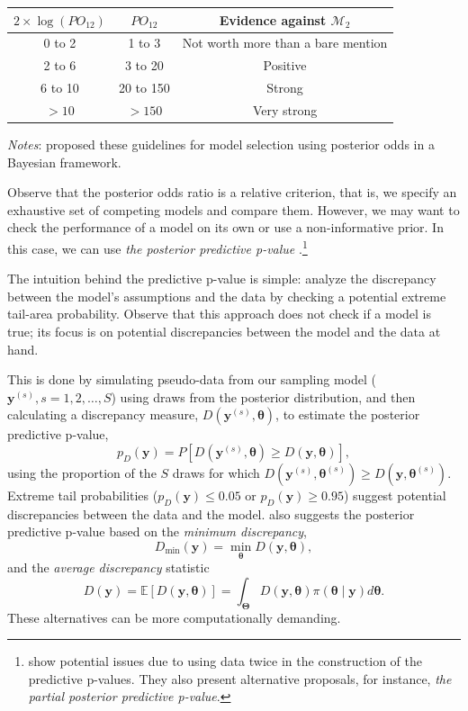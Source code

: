 \begin{table}%
	\label{tab:guide}%
	\begin{tabular}{ccc}
		\textbf{$2\times\log(PO_{12})$}    & \textbf{$PO_{12}$} & \textbf{Evidence against $\mathcal{M}_2$} \\
		\hline
		0 to 2 & 1 to 3 & Not worth more than a bare mention\\
		2 to 6 & 3 to 20 & Positive\\
		6 to 10 & 20 to 150 & Strong\\
		$> 10$  & $> 150$ & Very strong\\
	\end{tabular}
				\begin{tablenotes}
	\footnotesize \textit{Notes}: \cite{Kass1995} proposed these guidelines for model selection using posterior odds in a Bayesian framework.\\
\end{tablenotes}
\end{table}
Observe that the posterior odds ratio is a relative criterion, that is, we specify an exhaustive set of competing models and compare them. However, we may want to check the performance of a model on its own or use a non-informative prior. In this case, we can use \textit{the posterior predictive p-value} \cite{Gelman1996,gelman1996posterior}.\footnote{\cite{Bayarri2000} show potential issues due to using data twice in the construction of the predictive p-values. They also present alternative proposals, for instance, \textit{the partial posterior predictive p-value}.}

The intuition behind the predictive p-value is simple: analyze the discrepancy between the model's assumptions and the data by checking a potential extreme tail-area probability. Observe that this approach does not check if a model is true; its focus is on potential discrepancies between the model and the data at hand.

This is done by simulating pseudo-data from our sampling model (\( \mathbf{y}^{(s)}, s=1,2,\dots,S \)) using draws from the posterior distribution, and then calculating a discrepancy measure, \( D(\mathbf{y}^{(s)},\bm{\theta}) \), to estimate the posterior predictive p-value,
\[
p_D(\mathbf{y}) = P[D(\mathbf{y}^{(s)},\bm{\theta}) \geq D(\mathbf{y},\bm{\theta})],
\]
using the proportion of the \( S \) draws for which \( D(\mathbf{y}^{(s)},\bm{\theta}^{(s)}) \geq D(\mathbf{y},\bm{\theta}^{(s)}) \). Extreme tail probabilities (\( p_D(\mathbf{y}) \leq 0.05 \) or \( p_D(\mathbf{y}) \geq 0.95 \)) suggest potential discrepancies between the data and the model. \cite{gelman1996posterior} also suggests the posterior predictive p-value based on the \textit{minimum discrepancy}, 
\[
D_{\min}(\mathbf{y}) = \min_{\bm{\theta}} D(\mathbf{y}, \bm{\theta}),
\]
and the \textit{average discrepancy} statistic 
\[
D(\mathbf{y}) = \mathbb{E}[D(\mathbf{y}, \bm{\theta})] = \int_{\mathbf{\Theta}} D(\mathbf{y}, \bm{\theta}) \pi(\bm{\theta} \mid \mathbf{y}) d\bm{\theta}.
\]
These alternatives can be more computationally demanding.

